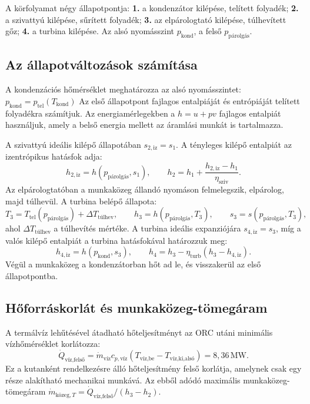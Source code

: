 \documentclass[12pt]{article}
\begin{document}
A körfolyamat négy állapotpontja: \textbf{1.} a kondenzátor kilépése,
telített folyadék; \textbf{2.} a szivattyú kilépése, sűrített folyadék;
\textbf{3.} az elpárologtató kilépése, túlhevített gőz;
\textbf{4.} a turbina kilépése. Az alsó nyomásszint
$p_{\text{kond}}$, a felső $p_{\text{párolgás}}$.

\subsection{Az állapotváltozások számítása}

A kondenzációs hőmérséklet meghatározza az alsó nyomásszintet:
$p_{\text{kond}}=p_{\text{tel}}(T_{\text{kond}})$
Az első állapotpont fajlagos entalpiáját és entrópiáját telített
folyadékra számítjuk. Az energiamérlegekben a $h=u+pv$ fajlagos
entalpiát használjuk, amely a belső energia mellett az áramlási
munkát is tartalmazza.

A szivattyú ideális kilépő állapotában $s_{2,\text{iz}}=s_1$.
A tényleges kilépő entalpiát az izentrópikus hatásfok adja:
\begin{equation}
    h_{2,\text{iz}}=h(p_{\text{párolgás}},s_1),
    \qquad
    h_2=h_1+\frac{h_{2,\text{iz}}-h_1}{\eta_{\text{sziv}}}.
\end{equation}
Az elpárologtatóban a munkaközeg állandó nyomáson felmelegszik,
elpárolog, majd túlhevül. A turbina belépő állapota:
\begin{equation}
    T_3=T_{\text{tel}}(p_{\text{párolgás}})
        +\Delta T_{\text{túlhev}},
    \qquad
    h_3=h(p_{\text{párolgás}},T_3),
    \qquad
    s_3=s(p_{\text{párolgás}},T_3),
\end{equation}
ahol $\Delta T_{\text{túlhev}}$ a túlhevítés mértéke.
A turbina ideális expanziójára $s_{4,\text{iz}}=s_3$, míg a valós
kilépő entalpiát a turbina hatásfokával határozzuk meg:
\begin{equation}
    h_{4,\text{iz}}=h(p_{\text{kond}},s_3),
    \qquad
    h_4=h_3-\eta_{\text{turb}}(h_3-h_{4,\text{iz}}).
\end{equation}
Végül a munkaközeg a kondenzátorban hőt ad le, és visszakerül
az első állapotpontba.

\subsection{Hőforráskorlát és munkaközeg-tömegáram}

A termálvíz lehűtésével átadható hőteljesítményt az ORC utáni
minimális vízhőmérséklet korlátozza:
\begin{equation}
    \dot Q_{\text{víz,felső}}
    =\dot m_{\text{víz}}c_{p,\text{víz}}
    (T_{\text{víz,be}}-T_{\text{víz,ki,alsó}})
    =8{,}36\,\mathrm{MW}.
\end{equation}
Ez a kutanként rendelkezésre álló hőteljesítmény felső korlátja,
amelynek csak egy része alakítható mechanikai munkává.
Az ebből adódó maximális munkaközeg-tömegáram
$\dot m_{\text{közeg},T}=\dot Q_{\text{víz,felső}}/(h_3-h_2)$.
\end{document}
